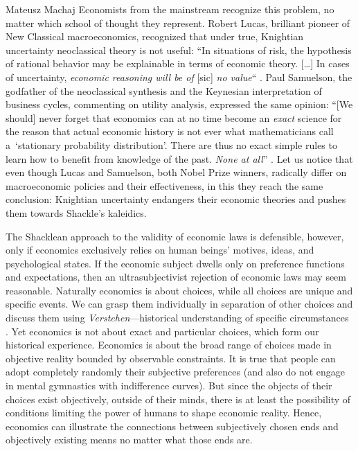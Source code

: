 \begin{artengenv}{Mateusz Machaj}
Economists from the mainstream recognize this problem, no matter which school of thought they represent. Robert Lucas, brilliant pioneer of New Classical macroeconomics, recognized that under true, Knightian uncertainty neoclassical theory is not useful: ``In situations of risk, the hypothesis of rational behavior may be explainable in terms of economic theory. […] In cases of uncertainty, \textit{economic reasoning will be of} [sic] \textit{no value}`` 
\parencite[][emphasis added]{lucas_understanding_1977}. %
 Paul Samuelson, the godfather of the neoclassical synthesis and the Keynesian interpretation of business cycles, commenting on utility analysis, expressed the same opinion: ``[We should] never forget that economics can at no time become an \textit{exact} science for the reason that actual economic history is not ever what mathematicians call a~‘stationary probability distribution'. There are thus no exact simple rules to learn how to benefit from knowledge of the past. \textit{None at all}'' 
\parencite[][emphasis added]{samuelson_asymmetric_2008}. %
 Let us notice that even though Lucas and Samuelson, both Nobel Prize winners, radically differ on macroeconomic policies and their effectiveness, in this they reach the same conclusion: Knightian uncertainty endangers their economic theories and pushes them towards Shackle's kaleidics.



The Shacklean approach to the validity of economic laws is defensible, however, only if economics exclusively relies on human beings' motives, ideas, and psychological states. If the economic subject dwells only on preference functions and expectations, then an ultrasubjectivist rejection of economic laws may seem reasonable. Naturally economics is about choices, while all choices are unique and specific events. We can grasp them individually in separation of other choices and discuss them using \textit{Verstehen}---historical understanding of specific circumstances 
\parencite[][]{tucker_max_1965}. %
 Yet economics is not about exact and particular choices, which form our historical experience. Economics is about the broad range of choices made in objective reality bounded by observable constraints. It is true that people can adopt completely randomly their subjective preferences (and also do not engage in mental gymnastics with indifference curves). But since the objects of their choices exist objectively, outside of their minds, there is at least the possibility of conditions limiting the power of humans to shape economic reality. Hence, economics can illustrate the connections between subjectively chosen ends and objectively existing means no matter what those ends are.




\end{artengenv}

